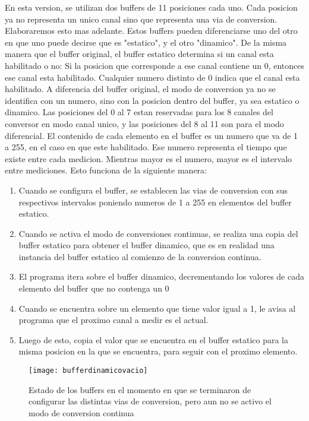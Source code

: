 En esta version, se utilizan dos buffers de 11 posiciones cada uno. Cada posicion ya no representa un unico canal sino que representa una via de conversion. Elaboraremos esto mas adelante. Estos buffers pueden diferenciarse uno del otro en que uno puede decirse que es "estatico", y el otro "dinamico". De la misma manera que el buffer original, el buffer estatico determina si un canal esta habilitado o no: Si la posicion que corresponde a ese canal contiene un 0, entonces ese canal esta habilitado. Cualquier numero distinto de 0 indica que el canal esta habilitado. A diferencia del buffer original, el modo de conversion ya no se identifica con un numero, sino con la posicion dentro del buffer, ya sea estatico o dinamico. Las posiciones del 0 al 7 estan reservadas para los 8 canales del conversor en modo canal unico, y las posiciones del 8 al 11 son para el modo diferencial. 
El contenido de cada elemento en el buffer es un numero que va de 1 a 255, en el caso en que este habilitado. Ese numero representa el tiempo que existe entre cada medicion. Mientras mayor es el numero, mayor es el intervalo entre mediciones. Esto funciona de la siguiente manera:

\begin{enumerate}
\item Cuando se configura el buffer, se establecen las vias de conversion con sus respectivos intervalos poniendo numeros de 1 a 255 en elementos del buffer estatico.
\item Cuando se activa el modo de conversiones continuas, se realiza una copia del buffer estatico para obtener el buffer dinamico, que es en realidad una instancia del buffer estatico al comienzo de la conversion continua.
\item El programa itera sobre el buffer dinamico, decrementando los valores de cada elemento del buffer que no contenga un 0
\item Cuando se encuentra sobre un elemento que tiene valor igual a 1, le avisa al programa que el proximo canal a medir es el actual.
\item Luego de esto, copia el valor que se encuentra en el buffer estatico para la misma posicion en la que se encuentra, para seguir con el proximo elemento.
\end{enumerate}


\begin{figure}[h]
  \centering
  \texttt{[image: bufferdinamicovacio]}
  \caption{Estado de los buffers en el momento en que se terminaron de configurar las distintas vias de conversion, pero aun no se activo el modo de conversion continua}\label{fig:bufferdinamicovacio}
\end{figure}



